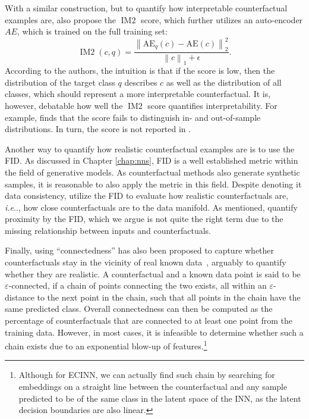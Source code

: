 \documentclass[11pt,a4paper,twoside,openright,final]{memoir}
\makeatletter
\DeclareRobustCommand\onedot{\futurelet\@let@token\@onedot}
\def\@onedot{\ifx\@let@token.\else.\null\fi\xspace}
\def\ie{\emph{i.e}\onedot} \def\Ie{\emph{I.e}\onedot}
\makeatother
\begin{document}
With a similar construction, but to quantify how interpretable counterfactual examples are, \citet{VanLooveren2019} also propose the $\operatorname{IM2}$ score, which further utilizes an auto-encoder $AE$, which is trained on the full training set:
\begin{equation}\label{eq:IM2}
\operatorname{IM2}\left(c, q\right)=\frac{\left\|\mathrm{AE}_{q}\left(c\right)-\mathrm{AE}\left(c\right)\right\|_{2}^{2}}{\left\|c\right\|_{1}+\epsilon}.
\end{equation}
According to the authors, the intuition is that if the score is low, then the distribution of the target class $q$ describes $c$ as well as the distribution of all classes, which should represent a more interpretable counterfactual.
It is, however, debatable how well the $\operatorname{IM2}$ score quantifies interpretability.
For example, \cite{Schut2021} finds that the score fails to distinguish in- and out-of-sample distributions.
In turn, the score is not reported in \cite{Schut2021}. 

Another way to quantify how realistic counterfactual examples are is to use the FID.
As discussed in Chapter \ref{chap:nns}, FID is a well established metric within the field of generative models.
As counterfactual methods also generate synthetic samples, it is reasonable to also apply the metric in this field.
Despite denoting it data consistency, \cite{Singla2019} utilize the FID to evaluate how realistic counterfactuals are, \ie, how close counterfactuals are to the data manifold.
As mentioned, \citet{Rodriguez2021} quantify proximity by the FID, which we argue is not quite the right term due to the missing relationship between inputs and counterfactuals.

Finally, using ``connectedness'' has also been proposed to capture whether counterfactuals stay in the vicinity of real known data~\cite{Laugel2019, Pawelczyk2020}, arguably to quantify whether they are realistic. 
A counterfactual and a known data point is said to be $\varepsilon$-connected, if a chain of points connecting the two exists, all within an $\varepsilon$-distance to the next point in the chain, such that all points in the chain have the same predicted class.
Overall connectedness can then be computed as the percentage of counterfactuals that are connected to at least one point from the training data.
However, in most cases, it is infeasible to determine whether such a chain exists due to an exponential blow-up of features.\footnote{Although for ECINN, we can actually find such chain by searching for embeddings on a straight line between the counterfactual and any sample predicted to be of the same class in the latent space of the INN, as the latent decision boundaries are also linear.}
\end{document}
